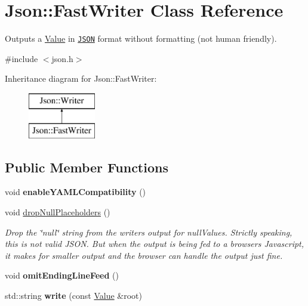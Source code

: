 \hypertarget{class_json_1_1_fast_writer}{}\section{Json\+:\+:Fast\+Writer Class Reference}
\label{class_json_1_1_fast_writer}


Outputs a \hyperlink{class_json_1_1_value}{Value} in \href{http://www.json.org}{\tt J\+S\+O\+N} format without formatting (not human friendly).  




{\ttfamily \#include $<$json.\+h$>$}

Inheritance diagram for Json\+:\+:Fast\+Writer\+:\begin{figure}[H]
\begin{center}
\leavevmode
\includegraphics[height=2.000000cm]{class_json_1_1_fast_writer}
\end{center}
\end{figure}
\subsection*{Public Member Functions}
\begin{DoxyCompactItemize}
\item 
\hypertarget{class_json_1_1_fast_writer_a78d98e9f76d33660ad6e6a1abe287d45}{}void {\bfseries enable\+Y\+A\+M\+L\+Compatibility} ()\label{class_json_1_1_fast_writer_a78d98e9f76d33660ad6e6a1abe287d45}

\item 
\hypertarget{class_json_1_1_fast_writer_a6e93d8dce951e408517311026a065b40}{}void \hyperlink{class_json_1_1_fast_writer_a6e93d8dce951e408517311026a065b40}{drop\+Null\+Placeholders} ()\label{class_json_1_1_fast_writer_a6e93d8dce951e408517311026a065b40}

\begin{DoxyCompactList}\small\item\em Drop the \char`\"{}null\char`\"{} string from the writer\textquotesingle{}s output for null\+Values. Strictly speaking, this is not valid J\+S\+O\+N. But when the output is being fed to a browser\textquotesingle{}s Javascript, it makes for smaller output and the browser can handle the output just fine. \end{DoxyCompactList}\item 
\hypertarget{class_json_1_1_fast_writer_af4ee077d365d75941fb2688d97207a55}{}void {\bfseries omit\+Ending\+Line\+Feed} ()\label{class_json_1_1_fast_writer_af4ee077d365d75941fb2688d97207a55}

\item 
\hypertarget{class_json_1_1_fast_writer_aa66218a56447222f91d64db618935a19}{}std\+::string {\bfseries write} (const \hyperlink{class_json_1_1_value}{Value} \&root)\label{class_json_1_1_fast_writer_aa66218a56447222f91d64db618935a19}

\end{DoxyCompactItemize}
